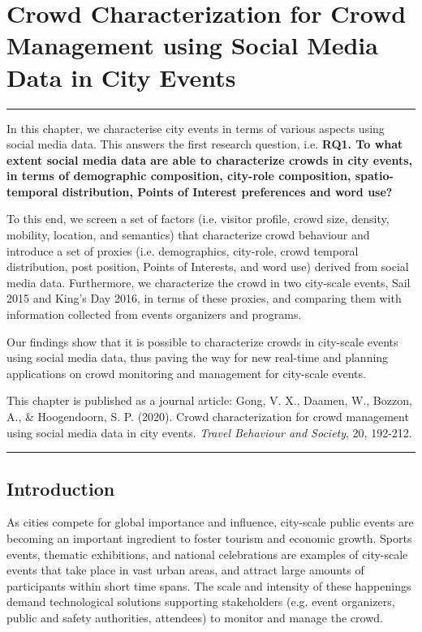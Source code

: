 \chapter{Crowd Characterization for Crowd Management using Social Media Data in City Events}\label{ch2_title}

\noindent\rule{\textwidth}{1pt}

In this chapter, we characterise city events in terms of various aspects using social media data. This answers the first research question, i.e. \textbf{RQ1. To what extent social media data are able to characterize crowds in city events, in terms of demographic composition, city-role composition, spatio-temporal distribution, Points of Interest preferences and word use?} 

To this end, we screen a set of factors (i.e. visitor profile, crowd size, density, mobility, location, and semantics) that characterize crowd behaviour and introduce a set of proxies (i.e. demographics, city-role, crowd temporal distribution, post position, Points of Interests, and word use) derived from social media data. Furthermore, we characterize the crowd in two city-scale events, Sail 2015 and King's Day 2016, in terms of these proxies, and comparing them with information collected from events organizers and programs.

Our findings show that it is possible to characterize crowds in city-scale events using social media data, thus paving the way for new real-time and planning applications on crowd monitoring and management for city-scale events.


This chapter is published as a journal article: Gong, V. X., Daamen, W., Bozzon, A., \& Hoogendoorn, S. P. (2020). Crowd characterization for crowd management using social media data in city events. \emph{Travel Behaviour and Society}, 20, 192-212.

\noindent\rule{\textwidth}{1pt}

\newpage


\vspace*{-10mm}
\section{Introduction}\label{ch2_2.1_introduction}

As cities compete for global importance and influence, city-scale public events are becoming an important ingredient to foster tourism and economic growth. Sports events, thematic exhibitions, and national celebrations are examples of city-scale events that take place in vast urban areas, and attract large amounts of participants within short time spans. The scale and intensity of these happenings demand technological solutions supporting stakeholders (e.g. event organizers, public and safety authorities, attendees) to monitor and manage the crowd.
